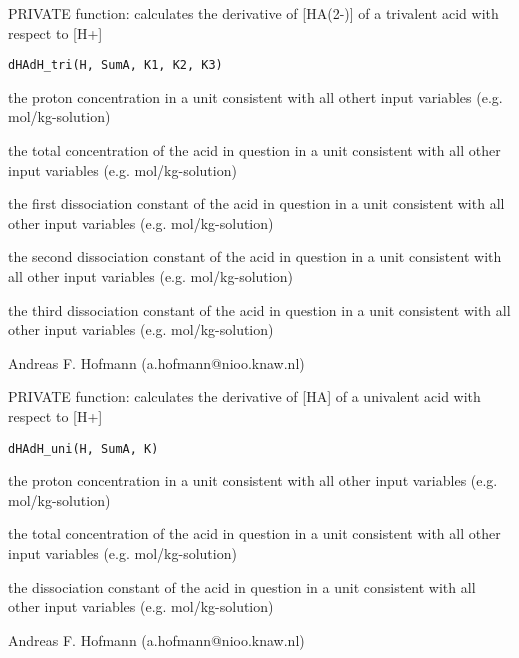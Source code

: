 \documentclass{article}
\begin{document}
\begin{Description}\relax
PRIVATE function: calculates the derivative of [HA(2-)] of a trivalent acid with respect to [H+]
\end{Description}
\begin{Usage}
\begin{verbatim}dHAdH_tri(H, SumA, K1, K2, K3)\end{verbatim}
\end{Usage}
\begin{Arguments}
\begin{ldescription}
\item[\code{H }] the proton concentration in a unit consistent with all othert input variables (e.g. mol/kg-solution)
\item[\code{SumA }] the total concentration of the acid in question in a unit consistent with all other input variables (e.g. mol/kg-solution)
\item[\code{K1 }] the first dissociation constant of the acid in question in a unit consistent with all other input variables (e.g. mol/kg-solution)
\item[\code{K2 }] the second dissociation constant of the acid in question in a unit consistent with all other input variables (e.g. mol/kg-solution)
\item[\code{K3 }] the third dissociation constant of the acid in question in a unit consistent with all other input variables (e.g. mol/kg-solution)
\end{ldescription}
\end{Arguments}
\begin{Author}\relax
Andreas F. Hofmann (a.hofmann@nioo.knaw.nl)
\end{Author}

\begin{Description}\relax
PRIVATE function: calculates the derivative of [HA] of a univalent acid with respect to [H+]
\end{Description}
\begin{Usage}
\begin{verbatim}dHAdH_uni(H, SumA, K)\end{verbatim}
\end{Usage}
\begin{Arguments}
\begin{ldescription}
\item[\code{H }] the proton concentration in a unit consistent with all other input variables (e.g. mol/kg-solution)
\item[\code{SumA }] the total concentration of the acid in question in a unit consistent with all other input variables (e.g. mol/kg-solution)
\item[\code{K }] the dissociation constant of the acid in question in a unit consistent with all other input variables (e.g. mol/kg-solution)
\end{ldescription}
\end{Arguments}
\begin{Author}\relax
Andreas F. Hofmann (a.hofmann@nioo.knaw.nl)
\end{Author}
\end{document}
